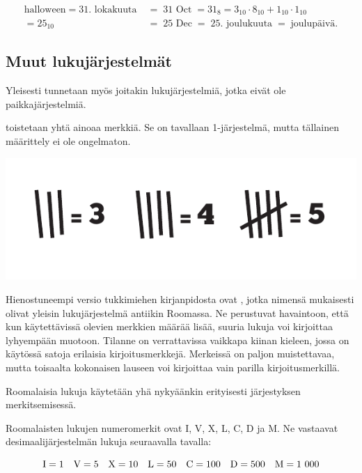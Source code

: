 \begin{align*}
	\text{halloween} \; = \; \text{31. lokakuuta} \; &= \; \text{31 Oct} \; = 31_8 = 3_{10} \cdot 8_{10} + 1_{10} \cdot 1_{10} \\
	= {25}_{10} &= \; \text{25 Dec} \; = \; \text{25. joulukuuta} \; = \; \text{joulupäivä.}
\end{align*}

\subsection*{Muut lukujärjestelmät}

Yleisesti tunnetaan myös joitakin lukujärjestelmiä, jotka eivät ole paikkajärjestelmiä.

 toistetaan yhtä ainoaa merkkiä. Se on tavallaan 1-järjestelmä, mutta tällainen määrittely ei ole ongelmaton.

\begin{center}
	\includegraphics{pictures/Kuva1-1-tukkimiehenkirjanpito.pdf}
\end{center}

Hienostuneempi versio tukkimiehen kirjanpidosta ovat , jotka nimensä mukaisesti olivat yleisin lukujärjestelmä antiikin Roomassa.
Ne perustuvat havaintoon, että kun käytettävissä olevien merkkien määrää lisää, suuria lukuja voi kirjoittaa lyhyempään muotoon.
Tilanne on verrattavissa vaikkapa kiinan kieleen, jossa on käytössä satoja erilaisia kirjoitusmerkkejä.
Merkeissä on paljon muistettavaa, mutta toisaalta kokonaisen lauseen voi kirjoittaa vain parilla kirjoitusmerkillä.

Roomalaisia lukuja käytetään yhä nykyäänkin erityisesti järjestyksen merkitsemisessä.

Roomalaisten lukujen numeromerkit ovat I, V, X, L, C, D ja M. Ne vastaavat desimaalijärjestelmän lukuja seuraavalla tavalla:

\begin{equation*}
	\rm I=1\quad
	V=5\quad
	X=10\quad
	L=50\quad
	C=100\quad
	D=500\quad
	M=1~000
\end{equation*}

